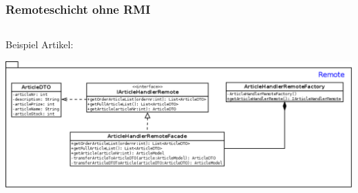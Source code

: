 
\begin{frame}
  \frametitle{Remoteschicht ohne RMI}
	    \begin{column}{1\linewidth}
	    	Beispiel Artikel:
	    	\begin{center}
	    		\includegraphics[width=1\textwidth]{images/classdia_article.png}
	    	\end{center}
	    \end{column}
\end{frame}